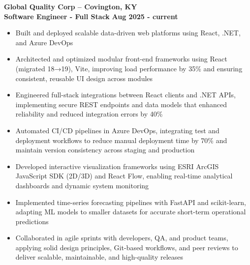 \documentclass[a4paper,10pt]{article}
\begin{document}
\textbf{Global Quality Corp – Covington, KY} \\[3.75pt]
\textbf{Software Engineer - Full Stack} \hfill \textbf{Aug 2025 - current} \\[3.75pt]
\begin{minipage}[t]{\linewidth}
\begin{itemize}[nosep,after=\strut, leftmargin=1em, itemsep=3pt,label=$\bullet$]
\item Built and deployed scalable data-driven web platforms using React, .NET, and Azure DevOps
\item Architected and optimized modular front-end frameworks using React (migrated 18→19), Vite, improving load performance by 35\% and ensuring consistent, reusable UI design across modules
\item Engineered full-stack integrations between React clients and .NET APIs, implementing secure REST endpoints and data models that enhanced reliability and reduced integration errors by 40\%
\item Automated CI/CD pipelines in Azure DevOps, integrating test and deployment workflows to reduce manual deployment time by 70\% and maintain version consistency across staging and production
\item Developed interactive visualization frameworks using ESRI ArcGIS JavaScript SDK (2D/3D) and React Flow, enabling real-time analytical dashboards and dynamic system monitoring
\item Implemented time-series forecasting pipelines with FastAPI and scikit-learn, adapting ML models to smaller datasets for accurate short-term operational predictions
\item Collaborated in agile sprints with developers, QA, and product teams, applying solid design principles, Git-based workflows, and peer reviews to deliver scalable, maintainable, and high-quality releases
\end{itemize}
\end{minipage}
\end{document}
